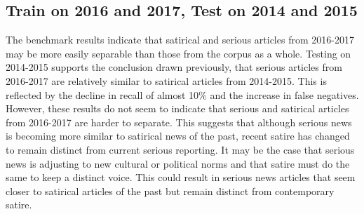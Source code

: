 \documentclass [12 pt] {report}
\begin{document}
\subsection{Train on 2016 and 2017, Test on 2014 and 2015}
\vspace*{-2mm}
\begin{table}[H]
\footnotesize
{}
\label{table:SVM 2016-2017 Train, 2014-2015 Test}
\end{table}
\vspace*{-2mm}

\vspace*{-2mm}
\begin{table}[H]
\small
{}
\label{table:Train 2016-2017, Test 2014-2015 Confusion}
\end{table}
\FloatBarrier
The benchmark results indicate that satirical and serious articles from 2016-2017 may be more easily separable than those from the corpus as a whole. Testing on 2014-2015 supports the conclusion drawn previously, that serious articles from 2016-2017 are relatively similar to satirical articles from 2014-2015. This is reflected by the decline in recall of almost 10\% and the increase in false negatives. However, these results do not seem to indicate that serious and satirical articles from 2016-2017 are harder to separate. This suggests that although serious news is becoming more similar to satirical news of the past, recent satire has changed to remain distinct from current serious reporting. It may be the case that serious news is adjusting to new cultural or political norms and that satire must do the same to keep a distinct voice. This could result in serious news articles that seem closer to satirical articles of the past but remain distinct from contemporary satire.
\end{document}
